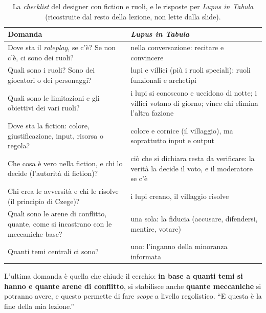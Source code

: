 \begin{table}[htbp]
\centering
\small
\caption{La \emph{checklist} del designer con fiction e ruoli, e le risposte per \emph{Lupus in
Tabula} (ricostruite dal resto della lezione, non lette dalla slide).}
\label{a16:tab:checklist}
\begin{tabular}{@{}>{\raggedright\arraybackslash}p{6.4cm}>{\raggedright\arraybackslash}p{7.0cm}@{}}
\toprule
\textbf{Domanda} & \textbf{\emph{Lupus in Tabula}} \\
\midrule
Dove sta il \emph{roleplay}, se c'è? Se non c'è, ci sono dei ruoli? & nella conversazione:
  recitare e convincere \\
Quali sono i ruoli? Sono dei giocatori o dei personaggi? & lupi e villici (più i ruoli speciali):
  ruoli funzionali e archetipi \\
Quali sono le limitazioni e gli obiettivi dei vari ruoli? & i lupi si conoscono e uccidono di
  notte; i villici votano di giorno; vince chi elimina l'altra fazione \\
Dove sta la fiction: colore, giustificazione, input, risorsa o regola? & colore e cornice (il
  villaggio), ma soprattutto input e output \\
Che cosa è vero nella fiction, e chi lo decide (l'autorità di fiction)? & ciò che si dichiara
  resta da verificare: la verità la decide il voto, e il moderatore se c'è \\
Chi crea le avversità e chi le risolve (il principio di Czege)? & i lupi creano, il villaggio
  risolve \\
Quali sono le arene di conflitto, quante, come si incastrano con le meccaniche base? & una sola:
  la fiducia (accusare, difendersi, mentire, votare) \\
Quanti temi centrali ci sono? & uno: l'inganno della minoranza informata \\
\bottomrule
\end{tabular}
\end{table}

L'ultima domanda è quella che chiude il cerchio: \textbf{in base a quanti temi si hanno e quante arene
di conflitto}, si stabilisce anche \textbf{quante meccaniche} si potranno avere, e questo permette di
fare \emph{scope} a livello regolistico. ``E questa è la fine della mia lezione.''

